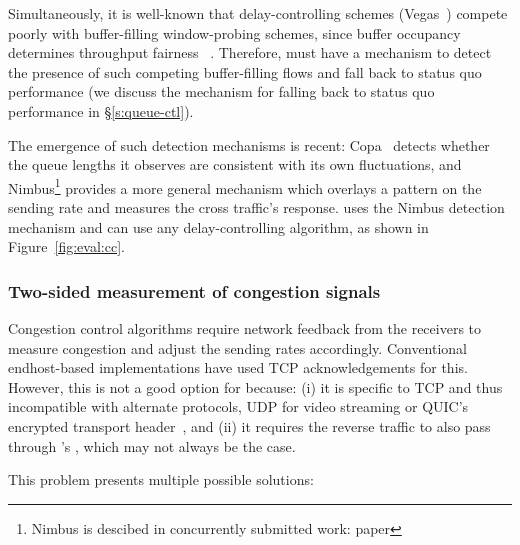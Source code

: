  Simultaneously, it is well-known that delay-controlling schemes (\eg Vegas~\cite{vegas}) compete poorly with buffer-filling window-probing schemes, since buffer occupancy determines throughput fairness~\cite{Jacobson88} . 
Therefore, \name must have a mechanism to detect the presence of such competing buffer-filling flows and fall back to status quo performance  (we discuss the mechanism for falling back to status quo performance in \S\ref{s:queue-ctl}).

The emergence of such detection mechanisms is recent: Copa~\cite{copa} detects whether the queue lengths it observes are consistent with its own fluctuations, and Nimbus\footnote{Nimbus is descibed in concurrently submitted work: paper } provides a more general mechanism which overlays a pattern on the sending rate and measures the cross traffic's response.
\name uses the Nimbus detection mechanism and can use any delay-controlling algorithm, as shown in Figure~\ref{fig:eval:cc}.

\subsubsection{Two-sided measurement of congestion signals}\label{s:design:twosided}
Congestion control algorithms require network feedback from the receivers to measure congestion and adjust the sending rates accordingly. 
Conventional endhost-based implementations have used TCP acknowledgements for this.
However, this is not a good option for \name because: 
(i) it is specific to TCP and thus incompatible with alternate protocols, \ie UDP for video streaming or QUIC's encrypted transport header~\cite{quic}, 
and (ii) it requires the reverse traffic to also pass through \name's \inbox, which may not always be the case.  

This problem presents multiple possible solutions:

